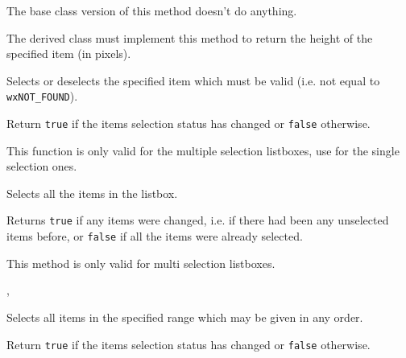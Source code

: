 The base class version of this method doesn't do anything.






\label{wxvlistboxonmeasureitem}


The derived class must implement this method to return the height of the
specified item (in pixels).


\label{wxvlistboxselect}


Selects or deselects the specified item which must be valid (i.e. not
equal to {\tt wxNOT\_FOUND}).

Return {\tt true} if the items selection status has changed or {\tt false}
otherwise.

This function is only valid for the multiple selection listboxes, use
 for the single selection ones.


\label{wxvlistboxselectall}


Selects all the items in the listbox.

Returns {\tt true} if any items were changed, i.e. if there had been any
unselected items before, or {\tt false} if all the items were already selected.

This method is only valid for multi selection listboxes.


, 


\label{wxvlistboxselectrange}


Selects all items in the specified range which may be given in any order.

Return {\tt true} if the items selection status has changed or {\tt false}
otherwise.

